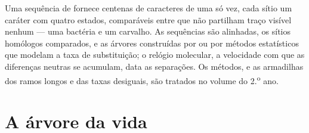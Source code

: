 \begin{remark}\label{rem:b1:classifying-biodiversity:molecular}
Uma sequência de  fornece centenas de caracteres de uma só vez,
cada sítio um caráter com quatro estados, comparáveis entre 
que não partilham traço visível nenhum --- uma bactéria e um carvalho.
As sequências são alinhadas, os sítios homólogos comparados, e as
árvores construídas por  ou por métodos estatísticos que
modelam a taxa de substituição; o relógio molecular, a velocidade com
que as diferenças neutras se acumulam, data as separações. Os métodos,
e as armadilhas dos ramos longos e das taxas desiguais, são tratados
no volume do 2.\textsuperscript{o} ano.
\end{remark}

\section{A árvore da vida}

